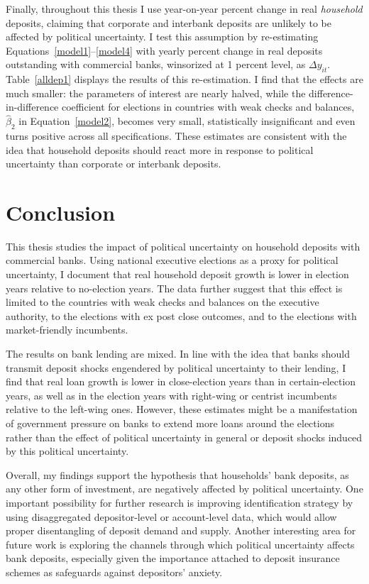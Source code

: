 \documentclass[12pt,a4paper]{article}
\begin{document}
Finally, throughout this thesis I use year-on-year percent change in real \emph{household} deposits, claiming that corporate and interbank deposits are unlikely to be affected by political uncertainty. I test this assumption by re-estimating Equations~\eqref{model1}--\eqref{model4} with yearly percent change in real deposits outstanding with commercial banks, winsorized at 1 percent level, as $\Delta y_{it}$. Table~\ref{alldep1} displays the results of this re-estimation. I find that the effects are much smaller: the parameters of interest are nearly halved, while the difference-in-difference coefficient for elections in countries with weak checks and balances, $\hat{\beta}_2$ in Equation~\eqref{model2}, becomes very small, statistically insignificant and even turns positive across all specifications. These estimates are consistent with the idea that household deposits should react more in response to political uncertainty than corporate or interbank deposits.

\section{Conclusion}\label{concl}
This thesis studies the impact of political uncertainty on household deposits with commercial banks. Using national executive elections as a proxy for political uncertainty, I document that real household deposit growth is lower in election years relative to no-election years. The data further suggest that this effect is limited to the countries with weak checks and balances on the executive authority, to the elections with ex post close outcomes, and to the elections with market-friendly incumbents.

The results on bank lending are mixed. In line with the idea that banks should transmit deposit shocks engendered by political uncertainty to their lending, I find that real loan growth is lower in close-election years than in certain-election years, as well as in the election years with right-wing or centrist incumbents relative to the left-wing ones. However, these estimates might be a manifestation of government pressure on banks to extend more loans around the elections rather than the effect of political uncertainty in general or deposit shocks induced by this political uncertainty.

Overall, my findings support the hypothesis that households' bank deposits, as any other form of investment, are negatively affected by political uncertainty. One important possibility for further research is improving identification strategy by using disaggregated depositor-level or account-level data, which would allow proper disentangling of deposit demand and supply. Another interesting area for future work is exploring the channels through which political uncertainty affects bank deposits, especially given the importance attached to deposit insurance schemes as safeguards against depositors' anxiety.
\end{document}
